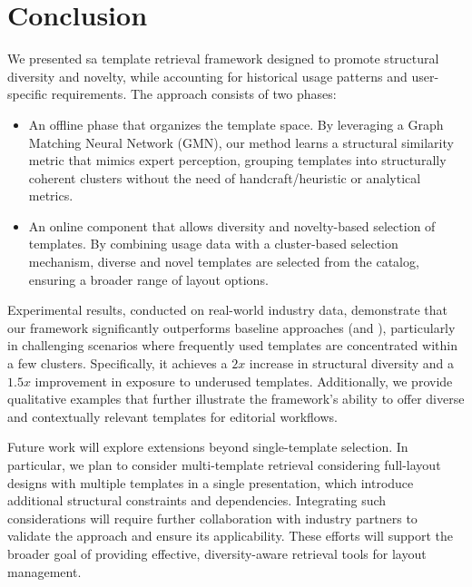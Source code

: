 \section{Conclusion} 
\label{sec:conclusion}

We presented sa template retrieval framework designed to promote structural diversity and novelty, while accounting for historical usage patterns and user-specific requirements. The approach consists of two phases: 

\begin{itemize}
    \item An offline phase that organizes the template space. By leveraging a Graph Matching Neural Network (GMN), our method learns a structural similarity metric that mimics expert perception, grouping templates into structurally coherent clusters without the need of handcraft/heuristic or analytical metrics.
    \item An online component that allows diversity and novelty-based selection of templates. By combining usage data with a cluster-based selection mechanism, diverse and novel templates are selected from the catalog, ensuring a broader range of layout options.
\end{itemize}

Experimental results, conducted on real-world industry data, demonstrate that our framework significantly outperforms baseline approaches (\classicclusdiv and \adaptedclusdiv), particularly in challenging scenarios where frequently used templates are concentrated within a few clusters. 
Specifically, it achieves a $2x$ increase in structural diversity and a $1.5x$ improvement in exposure to underused templates. Additionally, we provide qualitative examples that further illustrate the framework’s ability to offer diverse and contextually relevant templates for editorial workflows.

Future work will explore extensions beyond single-template selection. In particular, we plan to consider multi-template retrieval considering full-layout designs with multiple templates in a single presentation, which introduce additional structural constraints and dependencies. Integrating such considerations will require further collaboration with industry partners to validate the approach and ensure its applicability. These efforts will support the broader goal of providing effective, diversity-aware retrieval tools for layout management.
